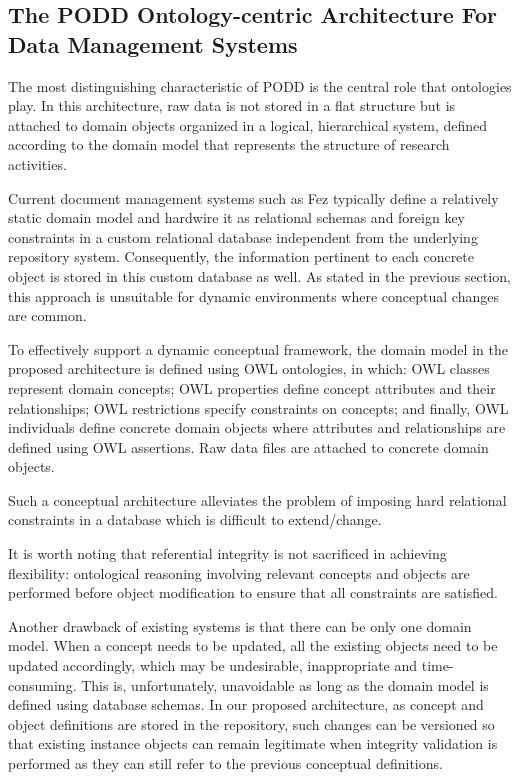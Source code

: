 \documentclass[conference,10pt]{IEEEtran}
\begin{document}
\subsection{The PODD Ontology-centric Architecture For Data Management Systems}
The most distinguishing characteristic of PODD is the central role that ontologies play. In this architecture, raw data is not stored in a flat structure but is attached to domain objects organized in a logical, hierarchical system, defined according to the domain model that represents the structure of research activities.

Current document management systems such as Fez typically define a relatively static domain model and hardwire it as relational schemas and foreign key constraints in a custom relational database independent from the underlying repository system. Consequently, the information pertinent to each concrete object is stored in this custom database as well. As stated in the previous section, this approach is unsuitable for dynamic environments where conceptual changes are common.

To effectively support a dynamic conceptual framework, the domain model in the proposed architecture is defined using OWL ontologies, in which: OWL classes represent domain concepts; OWL properties define concept attributes and their relationships; OWL restrictions specify constraints on concepts; and finally, OWL individuals define concrete domain objects where attributes and relationships are defined using OWL assertions. Raw data files are attached to concrete domain objects.

Such a conceptual architecture alleviates the problem of imposing hard relational constraints in a database which is difficult to extend/change.

It is worth noting that referential integrity is not sacrificed in achieving flexibility: ontological reasoning involving relevant concepts and objects are performed before object modification to ensure that all constraints are satisfied.

Another drawback of existing systems is that there can be only one domain model. When a concept needs to be updated, all the existing objects need to be updated accordingly, which may be undesirable, inappropriate and time-consuming. This is, unfortunately, unavoidable as long as the domain model is defined using database schemas. In our proposed architecture, as concept and object definitions are stored in the repository, such changes can be versioned so that existing instance objects can remain legitimate when integrity validation is performed as they can still refer to the previous conceptual definitions.
\end{document}
